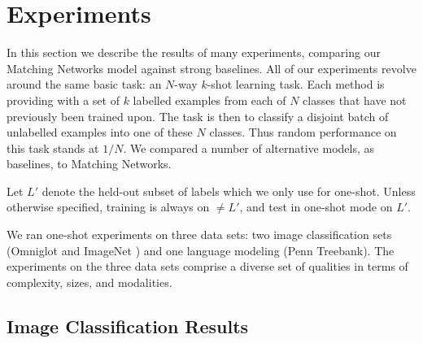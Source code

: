 \section{Experiments}
\label{sec:results}

In this section we describe the results of many experiments, comparing our Matching Networks model against strong baselines.
All of our experiments revolve around the same basic task: an $N$-way $k$-shot learning task.
Each method is providing with a set of $k$ labelled examples from each of $N$ classes that have not previously been trained upon.
The task is then to classify a disjoint batch of unlabelled examples into one of these $N$ classes.
Thus random performance on this task stands at $1/N$.
We compared a number of alternative models, as baselines, to Matching Networks.

Let $L'$ denote the held-out subset of labels which we only use for one-shot. Unless otherwise specified, training is always on $\neq\!\! L'$, and test in one-shot mode on $L'$.

We ran one-shot experiments on three data sets: two image classification sets (Omniglot \cite{omniglot} and ImageNet \cite[ILSVRC-2012]{ImageNet}) and one language modeling (Penn Treebank).
The experiments on the three data sets comprise a diverse set of qualities in terms of complexity, sizes, and modalities. 

\subsection{Image Classification Results}

